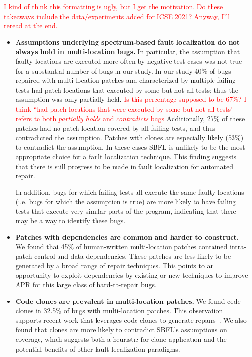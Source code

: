 \documentclass[10pt, conference]{IEEEtran}
\newcommand\todo[1]{\textcolor{red}{#1}}
\begin{document}
\todo{I kind of think this formatting is ugly, but I get the motivation.  Do
  these takeaways include the data/experiments added for ICSE 2021?  Anyway,
  I'll reread at the end.}
\begin{itemize}[wide, labelindent=0pt]
\item \textbf{Assumptions underlying spectrum-based fault
  localization do not always hold in multi-location bugs.}
In particular, the assumption that faulty locations
are executed more often by negative test cases was not true for a substantial
number of bugs in our study. In our study 40\% of bugs repaired with
multi-location patches and characterized by multiple failing tests had patch
locations that executed by some but not all tests; thus the assumption was only 
partially held.
\todo{Is this percentage supposed to be 67\%? 
I think ``had patch locations that were executed by some but not all tests'' 
refers to both \textit{partially holds} and \textit{contradicts} bugs} 
Additionally, 27\% of
these patches had no patch location covered by all failing
tests, and thus contradicted the assumption.  
Patches with clones are especially likely (53\%) to contradict the assumption.
In these cases SBFL is unlikely to be the most 
appropriate choice for a
fault localization technique. This finding suggests that there is still progress
to be made in fault localization for automated repair.

In addition, bugs for which failing tests all execute the same faulty locations (i.e. bugs for 
which the assumption is true) are more likely to have failing tests that execute very similar 
parts of the program, indicating that there may be a way to identify these bugs.

\item \textbf{Patches with dependencies are common and harder to construct.}
We found that 45\% of human-written multi-location patches contained
intra-patch control and data dependencies. These patches are less likely to be
generated by a broad range of repair techniques. 
This points to an opportunity to exploit dependencies by
existing or new techniques to improve APR for this large class of hard-to-repair
bugs.

\item\textbf{Code clones are prevalent in multi-location patches.}
We found code clones in 32.5\% of bugs with multi-location
patches. This observation supports recent work that leverages code clones to
generate repairs~\cite{saha2019harnessing}.
We also found that clones are more likely to contradict SBFL's assumptions 
on coverage, which suggests both a heuristic for clone application and the
potential benefits of other fault localization paradigms.


\end{itemize}
\end{document}
